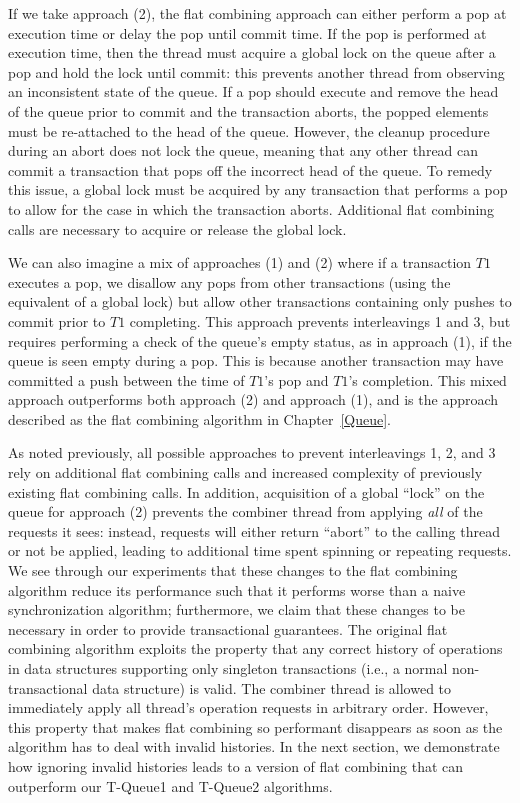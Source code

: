 If we take approach (2), the flat combining approach can either perform a pop at execution time or delay the pop until commit time. If the pop is performed at execution time, then the thread must acquire a global lock on the queue after a pop and hold the lock until commit: this prevents another thread from observing an inconsistent state of the queue. If a pop should execute and remove the head of the queue prior to commit and the transaction aborts, the popped elements must be re-attached to the head of the queue. However, the cleanup procedure during an abort does not lock the queue, meaning that any other thread can commit a transaction that pops off the incorrect head of the queue. To remedy this issue, a global lock must be acquired by any transaction that performs a pop to allow for the case in which the transaction aborts. Additional flat combining calls are necessary to acquire or release the global lock. 

We can also imagine a mix of approaches (1) and (2) where if a transaction $T1$ executes a pop, we disallow any pops from other transactions (using the equivalent of a global lock) but allow other transactions containing only pushes to commit prior to $T1$ completing. This approach prevents interleavings 1 and 3, but requires performing a check of the queue's empty status, as in approach (1), if the queue is seen empty during a pop. This is because another transaction may have committed a push between the time of $T1$'s pop and $T1$'s completion. This mixed approach outperforms both approach (2) and approach (1), and is the approach described as the flat combining algorithm in Chapter~\ref{Queue}. 

As noted previously, all possible approaches to prevent interleavings 1, 2, and 3 rely on additional flat combining calls and increased complexity of previously existing flat combining calls. In addition, acquisition of a global ``lock'' on the queue for approach (2) prevents the combiner thread from applying \emph{all} of the requests it sees: instead, requests will either return ``abort'' to the calling thread or not be applied, leading to additional time spent spinning or repeating requests. We see through our experiments that these changes to the flat combining algorithm reduce its performance such that it performs worse than a naive synchronization algorithm; furthermore, we claim that these changes to be necessary in order to provide transactional guarantees. The original flat combining algorithm exploits the property that any correct history of operations in data structures supporting only singleton transactions (i.e., a normal non-transactional data structure) is valid. The combiner thread is allowed to immediately apply all thread's operation requests in arbitrary order. However, this property that makes flat combining so performant disappears as soon as the algorithm has to deal with invalid histories. In the next section, we demonstrate how ignoring invalid histories leads to a version of flat combining that can outperform our T-Queue1 and T-Queue2 algorithms.


